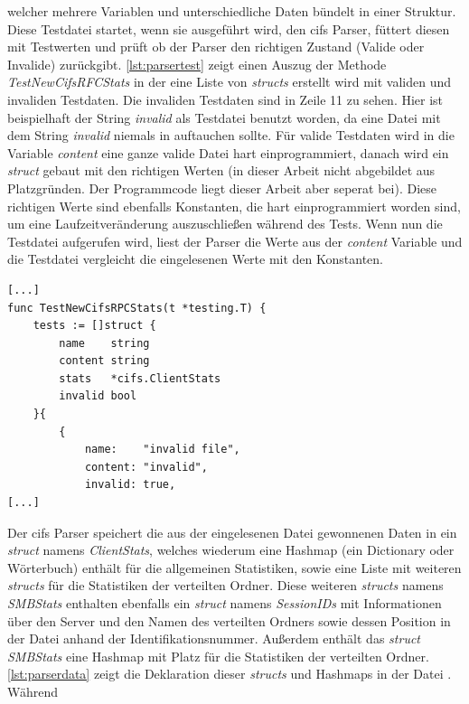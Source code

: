 \documentclass[titlepage]{report}
\begin{document}
welcher mehrere Variablen und unterschiedliche Daten bündelt in einer
Struktur. Diese Testdatei startet, wenn sie ausgeführt wird,
den \gls{cifs} Parser, füttert diesen mit Testwerten und prüft ob der
Parser den richtigen Zustand (Valide oder Invalide) zurückgibt.
\autoref{lst:parsertest} zeigt einen Auszug der Methode
\emph{TestNewCifsRFCStats} in der eine Liste von \emph{structs} erstellt
wird mit validen und invaliden Testdaten. Die invaliden Testdaten sind
in Zeile 11 zu sehen. Hier ist beispielhaft der String \emph{invalid}
als Testdatei benutzt worden, da eine Datei mit dem String
\emph{invalid} niemals in  auftauchen sollte.
Für valide Testdaten wird in die Variable \emph{content} eine ganze
valide Datei hart einprogrammiert, danach wird ein \emph{struct} gebaut
mit den richtigen Werten (in dieser Arbeit nicht abgebildet aus
Platzgründen. Der Programmcode liegt dieser Arbeit aber seperat bei).
Diese richtigen Werte sind ebenfalls Konstanten, die hart
einprogrammiert worden sind, um eine Laufzeitveränderung auszuschließen
während des Tests. Wenn nun die Testdatei aufgerufen wird, liest der
Parser die Werte aus der \emph{content} Variable und die Testdatei
vergleicht die eingelesenen
Werte mit den Konstanten.
\begin{minipage}{\linewidth}
\begin{lstlisting}[caption={Nicht vollständiger Auszug aus der Testdatei
cifs\_parse\_test.go für den CIFS Parser},label={lst:parsertest}]
[...]
func TestNewCifsRPCStats(t *testing.T) {
	tests := []struct {
		name    string
		content string
		stats   *cifs.ClientStats
		invalid bool
	}{
		{
			name:    "invalid file",
			content: "invalid",
			invalid: true,
[...]
\end{lstlisting}
\end{minipage}
Der \gls{cifs} Parser speichert die aus der eingelesenen Datei
gewonnenen Daten in ein \emph{struct} namens \emph{ClientStats}, welches
wiederum eine Hashmap (ein Dictionary oder Wörterbuch) enthält für die
allgemeinen Statistiken, sowie
eine Liste mit weiteren \emph{structs} für die Statistiken der
verteilten Ordner. Diese weiteren \emph{structs} namens \emph{SMBStats} enthalten ebenfalls ein
\emph{struct} namens \emph{SessionIDs} mit Informationen über den Server und den Namen des
verteilten Ordners sowie dessen Position in der Datei anhand der
Identifikationsnummer. Außerdem enthält das \emph{struct}
\emph{SMBStats} eine Hashmap mit Platz für die Statistiken der
verteilten Ordner. \autoref{lst:parserdata} zeigt die Deklaration dieser
\emph{structs} und Hashmaps in der Datei . Während
\end{document}
